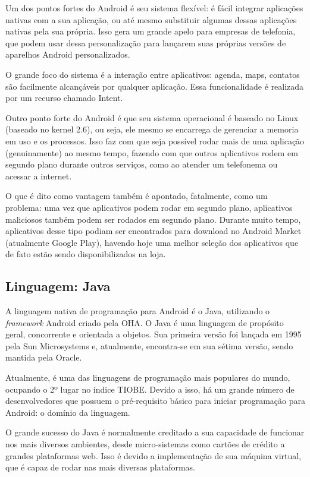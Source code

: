  	Um dos pontos fortes do Android é seu sistema flexível: é fácil integrar aplicações nativas com a sua aplicação, ou até mesmo substituir algumas dessas aplicações nativas pela sua própria. Isso gera um grande apelo para empresas de telefonia, que podem usar dessa personalização para lançarem suas próprias versões de aparelhos Android personalizados.
	
 	O grande foco do sistema é a interação entre aplicativos: agenda, maps, contatos são facilmente alcançáveis por qualquer aplicação. Essa funcionalidade é realizada por um recurso chamado Intent.%
	
 	Outro ponto forte do Android é que seu sistema operacional é baseado no Linux (baseado no kernel 2.6), ou seja, ele mesmo se encarrega de gerenciar a memoria em uso e os processos. Isso faz com que seja possível rodar mais de uma aplicação (genuinamente) ao mesmo tempo, fazendo com que outros aplicativos rodem em segundo plano durante outros serviços, como ao atender um telefonema ou acessar a internet.  
	
 	O que é dito como vantagem também é apontado, fatalmente, como um problema: uma vez que aplicativos podem rodar em segundo plano, aplicativos maliciosos também podem ser rodados em segundo plano. Durante muito tempo, aplicativos desse tipo podiam ser encontrados para download no Android Market (atualmente Google Play), havendo hoje uma melhor seleção dos aplicativos que de fato estão sendo disponibilizados na loja.

 \subsection{Linguagem: Java} 
 	A linguagem nativa de programação para Android é o Java, utilizando o \emph{framework} Android criado pela \ac{OHA}.
 	O Java é uma linguagem de propósito geral, concorrente e orientada a objetos. Sua primeira versão foi lançada em 1995 pela Sun Microsystems e, atualmente, encontra-se em sua sétima versão, sendo mantida pela Oracle. 
	
 	Atualmente, é uma das linguagens de programação mais populares do mundo, ocupando o 2º lugar no índice TIOBE. Devido a isso, há um grande número de desenvolvedores que possuem o pré-requisito básico para iniciar programação para Android: o domínio da linguagem.
	
 	O grande sucesso do Java é normalmente creditado a sua capacidade de funcionar nos mais diversos ambientes, desde micro-sistemas como cartões de crédito a grandes plataformas web. Isso é devido a implementação de sua máquina virtual, que é capaz de rodar nas mais diversas plataformas. 


